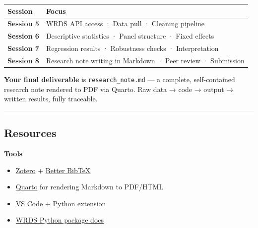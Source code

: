 \documentclass[
  letterpaper,
  DIV=11,
  numbers=noendperiod]{scrartcl}
\providecommand{\tightlist}{%
  \setlength{\itemsep}{0pt}\setlength{\parskip}{0pt}}\usepackage{longtable,booktabs,array}
\begin{document}
\begin{longtable}[]{@{}
  >{\raggedright\arraybackslash}p{}
  >{\raggedright\arraybackslash}p{}@{}}
\toprule\noalign{}
\begin{minipage}[b]{\linewidth}\raggedright
Session
\end{minipage} & \begin{minipage}[b]{\linewidth}\raggedright
Focus
\end{minipage} \\
\midrule\noalign{}
\endhead
\bottomrule\noalign{}
\endlastfoot
\textbf{Session 5} & WRDS API access · Data pull · Cleaning pipeline \\
\textbf{Session 6} & Descriptive statistics · Panel structure · Fixed
effects \\
\textbf{Session 7} & Regression results · Robustness checks ·
Interpretation \\
\textbf{Session 8} & Research note writing in Markdown · Peer review ·
Submission \\
\end{longtable}

\textbf{Your final deliverable} is \texttt{research\_note.md} --- a
complete, self-contained research note rendered to PDF via Quarto. Raw
data → code → output → written results, fully traceable.

\begin{center}\rule{0.5\linewidth}{0.5pt}\end{center}

\subsection{Resources}\label{resources}

\textbf{Tools}

\begin{itemize}
\tightlist
\item
  \href{https://www.zotero.org/}{Zotero} +
  \href{https://retorque.re/zotero-better-bibtex/}{Better BibTeX}
\item
  \href{https://quarto.org/}{Quarto} for rendering Markdown to PDF/HTML
\item
  \href{https://code.visualstudio.com/}{VS Code} + Python extension
\item
  \href{https://wrds-www.wharton.upenn.edu/pages/support/programming-wrds/programming-python/}{WRDS
  Python package docs}
\end{itemize}
\end{document}
